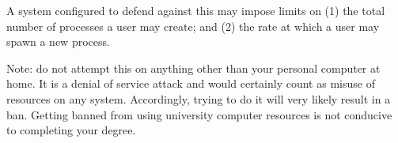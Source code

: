A system configured to defend against this may impose limits on (1) the total number of processes a user may create; and (2) the rate at which a user may spawn a new process.

Note: do not attempt this on anything other than your personal computer at home. It is a denial of service attack and would certainly count as misuse of resources on any system. Accordingly, trying to do it will very likely result in a ban. Getting banned from using university computer resources is not conducive to completing your degree.




